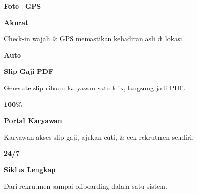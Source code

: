 \documentclass[a4paper]{article}
\begin{document}
\noindent
\begin{minipage}[t]{0.485\textwidth}
    \noindent\colorbox{BlueBg}{%
        \begin{minipage}[t][2.7cm][c]{\dimexpr\linewidth-2\fboxsep\relax}
            \centering
            {\fontsize{20}{24}\selectfont\bfseries\color{BluePrimary} Foto+GPS}\par\vspace{2pt}
            {\fontsize{9.5}{12}\selectfont\bfseries\color{BlueDark} Akurat}\par\vspace{2pt}
            {\fontsize{8.5}{11}\selectfont\color{TextDark}Check-in wajah \& GPS memastikan kehadiran asli di lokasi.}
        \end{minipage}}\par
    \vspace{6pt}
    \noindent\colorbox{BlueBg}{%
        \begin{minipage}[t][2.7cm][c]{\dimexpr\linewidth-2\fboxsep\relax}
            \centering
            {\fontsize{20}{24}\selectfont\bfseries\color{BluePrimary} Auto}\par\vspace{2pt}
            {\fontsize{9.5}{12}\selectfont\bfseries\color{BlueDark} Slip Gaji PDF}\par\vspace{2pt}
            {\fontsize{8.5}{11}\selectfont\color{TextDark}Generate slip ribuan karyawan satu klik, langsung jadi PDF.}
        \end{minipage}}%
\end{minipage}%
\hfill
\begin{minipage}[t]{0.485\textwidth}
    \noindent\colorbox{BlueBg}{%
        \begin{minipage}[t][2.7cm][c]{\dimexpr\linewidth-2\fboxsep\relax}
            \centering
            {\fontsize{20}{24}\selectfont\bfseries\color{BluePrimary} 100\%}\par\vspace{2pt}
            {\fontsize{9.5}{12}\selectfont\bfseries\color{BlueDark} Portal Karyawan}\par\vspace{2pt}
            {\fontsize{8.5}{11}\selectfont\color{TextDark}Karyawan akses slip gaji, ajukan cuti, \& cek rekrutmen sendiri.}
        \end{minipage}}\par
    \vspace{6pt}
    \noindent\colorbox{BlueBg}{%
        \begin{minipage}[t][2.7cm][c]{\dimexpr\linewidth-2\fboxsep\relax}
            \centering
            {\fontsize{20}{24}\selectfont\bfseries\color{BluePrimary} 24/7}\par\vspace{2pt}
            {\fontsize{9.5}{12}\selectfont\bfseries\color{BlueDark} Siklus Lengkap}\par\vspace{2pt}
            {\fontsize{8.5}{11}\selectfont\color{TextDark}Dari rekrutmen sampai offboarding dalam satu sistem.}
        \end{minipage}}%
\end{minipage}
\end{document}
